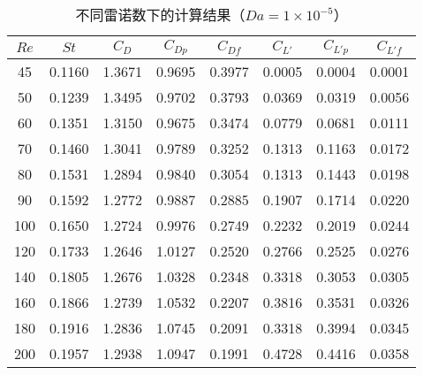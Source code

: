 \begin{table}[ht]
	\caption{不同雷诺数下的计算结果（$Da=1\times 10^{-5}$）}\label{tab: results-1e-5}
	\vspace{.5em}\centering\wuhao
	\begin{tabular}{*{8}{c}}
		\toprule[1.5pt]
		$Re$ & $St$ & $C_D$ & $C_{Dp}$ & $C_{Df}$ & $C_{L'}$ & $C_{L'p}$ & $C_{L'f}$ \\
		\midrule[1pt]
		45  & 0.1160 & 1.3671 & 0.9695 & 0.3977 & 0.0005 & 0.0004 & 0.0001 \\
		50  & 0.1239 & 1.3495 & 0.9702 & 0.3793 & 0.0369 & 0.0319 &	0.0056 \\
		60  & 0.1351 & 1.3150 & 0.9675 & 0.3474 & 0.0779 & 0.0681 & 0.0111 \\
		70  & 0.1460 & 1.3041 & 0.9789 & 0.3252 & 0.1313 & 0.1163 &	0.0172 \\
		80  & 0.1531 & 1.2894 &	0.9840 & 0.3054 & 0.1313 & 0.1443 &	0.0198 \\
		90  & 0.1592 & 1.2772 &	0.9887 & 0.2885 & 0.1907 & 0.1714 &	0.0220 \\
		100 & 0.1650 & 1.2724 &	0.9976 & 0.2749 & 0.2232 & 0.2019 &	0.0244 \\
		120 & 0.1733 & 1.2646 &	1.0127 & 0.2520 & 0.2766 & 0.2525 &	0.0276 \\
		140 & 0.1805 & 1.2676 &	1.0328 & 0.2348 & 0.3318 & 0.3053 &	0.0305 \\
		160 & 0.1866 & 1.2739 &	1.0532 & 0.2207 & 0.3816 & 0.3531 &	0.0326 \\
		180 & 0.1916 & 1.2836 &	1.0745 & 0.2091 & 0.3318 & 0.3994 &	0.0345 \\
		200 & 0.1957 & 1.2938 &	1.0947 & 0.1991 & 0.4728 & 0.4416 &	0.0358 \\
		\bottomrule[1.5pt]
	\end{tabular}
\end{table}


